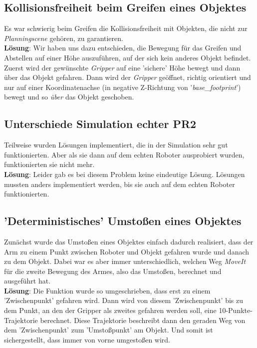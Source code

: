 \documentclass{suturo}
\begin{document}
\subsection{Kollisionsfreiheit beim Greifen eines Objektes}
Es war schwierig beim Greifen die Kollisionsfreiheit mit Objekten, die nicht zur \textit{Planningscene} gehören, zu garantieren.\\
\textbf{Lösung}: Wir haben uns dazu entschieden, die Bewegung für das Greifen und Abstellen auf einer Höhe auszuführen, auf der sich kein anderes Objekt befindet. Zuerst wird der gewünschte \textit{Gripper} auf eine 'sichere' Höhe bewegt und dann über das Objekt gefahren. Dann wird der \textit{Gripper} geöffnet, richtig orientiert und nur auf einer Koordinatenachse (in negative Z-Richtung von '\textit{base\_footprint}') bewegt und so \textit{über} das Objekt geschoben.\\

\subsection{Unterschiede Simulation echter PR2}
Teilweise wurden Lösungen implementiert, die in der Simulation sehr gut funktionierten. Aber als sie dann auf dem echten Roboter ausprobiert wurden,
funktionierten sie nicht mehr.\\
\textbf{Lösung}: Leider gab es bei diesem Problem keine eindeutige Lösung. Lösungen mussten anders implementiert werden, bis sie auch auf dem echten Roboter funktionierten.

\subsection{'Deterministisches' Umstoßen eines Objektes}
Zunächst wurde das Umstoßen eines Objektes einfach dadurch realisiert, dass der Arm zu einem Punkt zwischen Roboter und Objekt gefahren wurde und danach zu dem Objekt. Dabei war es aber immer unterschiedlich, welchen Weg \textit{MoveIt} für die zweite Bewegung des Armes, also das Umstoßen, berechnet und ausgeführt hat.\\
\textbf{Lösung}: Die Funktion wurde so umgeschrieben, dass erst zu einem 'Zwischenpunkt' gefahren wird. Dann wird von diesem 'Zwischenpunkt' bis zu dem Punkt, an den der Gripper als zweites gefahren werden soll, eine 10-Punkte-Trajektorie berechnet. Diese Trajektorie beschreibt dann den geraden Weg von dem 'Zwischenpunkt' zum 'Umstoßpunkt' am Objekt. Und somit ist sichergestellt, dass immer von vorne umgestoßen wird.
\end{document}
